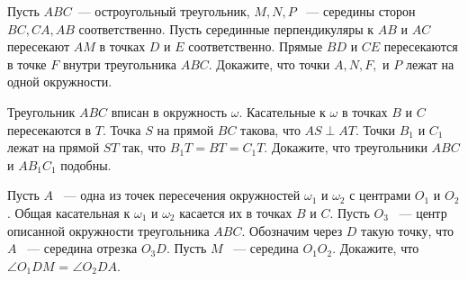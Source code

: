 \documentclass{article}
\begin{document}
\begin{enumerate_boxed}
        \item Пусть $ ABC $~--- остроугольный треугольник, $  M, N, P $ ~--- середины сторон $ BC, CA, AB  $ соответственно.
        Пусть серединные перпендикуляры к $ AB $ и $ AC $ пересекают $ AM $ в точках $ D $ и $ E $ соответственно.
        Прямые $ BD $ и $ CE $ пересекаются в точке $ F $ внутри треугольника $ ABC $.
        Докажите, что точки $ A, N, F,  $ и $ P $ лежат на одной окружности.

        \item Треугольник $ ABC $ вписан в окружность $\omega$.
        Касательные к $\omega$ в точках $ B $ и $ C $ пересекаются в $ T $.
        Точка $ S $ на прямой $ BC $ такова, что $ AS \perp AT $.
        Точки $ B_1 $ и $ C_1 $ лежат на прямой $ ST $ так, что $ B_{1}T  = BT = C_{1}T$.
        Докажите, что треугольники $ ABC $ и $ AB_{1}C_1 $ подобны.

        \item Пусть $ A $ ~--- одна из точек пересечения окружностей $ \omega_1 $ и $ \omega_2 $ с центрами $ O_1 $ и $ O_2 $.
        Общая касательная к $\omega_1$ и $\omega_2$ касается их в точках $ B $ и $ C $.
        Пусть $ O_3 $ ~--- центр описанной окружности треугольника $ ABC $.
        Обозначим через $ D $ такую точку, что $ A $ ~--- середина отрезка $ O_{3}D $.
        Пусть $ M $ ~--- середина $ O_{1}O_2 $.
        Докажите, что $ \angle O_{1}DM $ = $ \angle O_{2}DA $.
    \end{enumerate_boxed}
\end{document}
